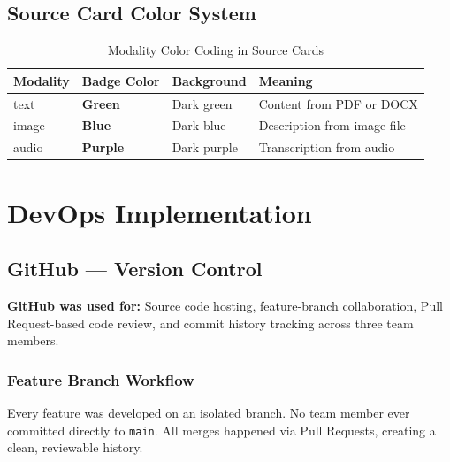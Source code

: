 \documentclass[12pt,a4paper]{report}
\begin{document}
\section{Source Card Color System}

\begin{table}[H]
\centering
\caption{Modality Color Coding in Source Cards}
\begin{tabular}{llll}
\toprule
\textbf{Modality} & \textbf{Badge Color} & \textbf{Background} & \textbf{Meaning} \\
\midrule
text  & \textcolor{agilegreen}{\textbf{Green}}  & Dark green & Content from PDF or DOCX \\
image & \textcolor{codeblue}{\textbf{Blue}}   & Dark blue  & Description from image file \\
audio & \textcolor{accentorange}{\textbf{Purple}} & Dark purple & Transcription from audio \\
\bottomrule
\end{tabular}
\end{table}

\chapter{DevOps Implementation}

\section{GitHub --- Version Control}

\begin{mdframed}[style=toolbox]
\textbf{GitHub was used for:} Source code hosting, feature-branch collaboration, Pull Request-based code review, and commit history tracking across three team members.
\end{mdframed}

\subsection{Feature Branch Workflow}

Every feature was developed on an isolated branch. No team member ever committed directly to \texttt{main}. All merges happened via Pull Requests, creating a clean, reviewable history.
\end{document}
